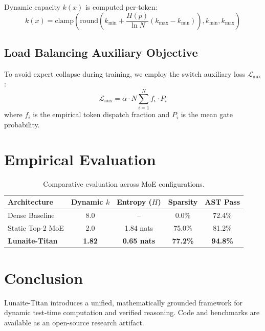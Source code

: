 \documentclass[10pt,twocolumn,letterpaper]{article}
\begin{document}
Dynamic capacity $k(x)$ is computed per-token:
\begin{equation}
k(x) = \mathrm{clamp}\left(\mathrm{round}\left(k_{\min} + \frac{H(p)}{\ln N}(k_{\max} - k_{\min})\right), k_{\min}, k_{\max}\right)
\end{equation}

\subsection{Load Balancing Auxiliary Objective}
To avoid expert collapse during training, we employ the switch auxiliary loss $\mathcal{L}_{\mathrm{aux}}$:
\begin{equation}
\mathcal{L}_{\mathrm{aux}} = \alpha \cdot N \sum_{i=1}^N f_i \cdot P_i
\end{equation}
where $f_i$ is the empirical token dispatch fraction and $P_i$ is the mean gate probability.

\section{Empirical Evaluation}
\begin{table}[h]
\centering
\small
\begin{tabular}{@{}lcccc@{}}
\toprule
\textbf{Architecture} & \textbf{Dynamic $k$} & \textbf{Entropy ($H$)} & \textbf{Sparsity} & \textbf{AST Pass} \\
\midrule
Dense Baseline & 8.0 & -- & 0.0\% & 72.4\% \\
Static Top-2 MoE & 2.0 & 1.84 nats & 75.0\% & 81.2\% \\
\textbf{Lunaite-Titan} & \textbf{1.82} & \textbf{0.65 nats} & \textbf{77.2\%} & \textbf{94.8\%} \\
\bottomrule
\end{tabular}
\caption{Comparative evaluation across MoE configurations.}
\end{table}

\section{Conclusion}
Lunaite-Titan introduces a unified, mathematically grounded framework for dynamic test-time computation and verified reasoning. Code and benchmarks are available as an open-source research artifact.
\end{document}
